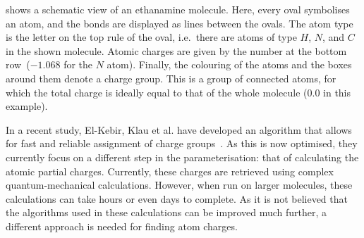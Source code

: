  shows a schematic view of an ethanamine molecule. Here, every oval symbolises an atom, and the bonds are displayed as lines between the ovals. The atom type is the letter on the top rule of the oval, i.e.\ there are atoms of type $H$, $N$, and $C$ in the shown molecule. Atomic charges are given by the number at the bottom row~($-1.068$ for the $N$ atom). Finally, the colouring of the atoms and the boxes around them denote a charge group. This is a group of connected atoms, for which the total charge is ideally equal to that of the whole molecule ($0.0$ in this example).

In a recent study, El-Kebir, Klau et al. have developed an algorithm that allows for fast and reliable assignment of charge groups~\cite{canzar2012charge}. As this is now optimised, they currently focus on a different step in the parameterisation: that of calculating the atomic partial charges. Currently, these charges are retrieved using complex quantum-mechanical calculations. However, when run on larger molecules, these calculations can take hours or even days to complete. As it is not believed that the algorithms used in these calculations can be improved much further, a different approach is needed for finding atom charges.

